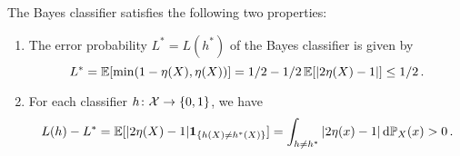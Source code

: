 \begin{theorem}
\label{thm: bayes classifier}
The Bayes classifier satisfies the following two properties:
\begin{enumerate}
    \item The error probability $L^* = L(h^*)$ of the Bayes classifier is given by
    \begin{equation}
        \label{eq: bayes error}
        L^* = \operatorname{\mathbb{E}}[\min(1 - \eta(X), \eta(X))] = 1/2 - 1/2 \operatorname{\mathbb{E}}[\abs{2\eta(X) - 1}] \leq 1/2 \, .
    \end{equation}

    \item For each classifier $h \colon \mathcal{X} \to \set{0, 1}$, we have
    \begin{equation}
        \label{eq: excess risk}
        L(h) - L^* = \Exp[\abs{2\eta(X) - 1} \indSet{h(X) \neq h^*(X)}] = \int_{h \neq h^*} \abs{2\eta(x) - 1} \dP_X(x) > 0 \, .
    \end{equation}
\end{enumerate}
\end{theorem}

